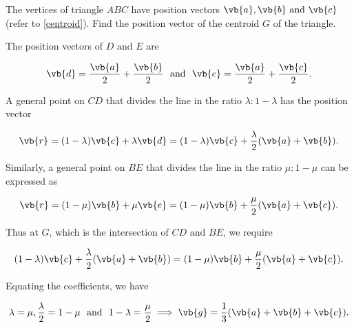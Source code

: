 \documentclass[a4paper,12pt]{report}
\begin{document}
{The vertices of triangle \(ABC\) have position vectors \(\vb{a} ,\vb{b} \text { and } \vb{c} \) (refer to \cref{centroid}). Find the position vector of the centroid \(G\) of the triangle.}
{The position vectors of \(D \text { and } E\) are 

\begin{equation}
    \vb{d} = \frac{\vb{a} }{2} + \frac{\vb{b} }{2} ~\text { and }~ \vb{e} = \frac{\vb{a} }{2} + \frac{\vb{c} }{2}.    
\end{equation}

A general point on \(CD\) that divides the line in the ratio \(\lambda : 1- \lambda \) has the position vector 

\begin{equation}
    \vb{r} = (1-\lambda )\vb{c} + \lambda \vb{d} = (1-\lambda )\vb{c} + \frac{\lambda }{2} (\vb{a} +\vb{b} ). 
\end{equation}

Similarly, a general point on \(BE\) that divides the line in the ratio \(\mu :1-\mu \) can be expressed as 

\begin{equation}
    \vb{r} = (1-\mu )\vb{b} + \mu \vb{e} = (1-\mu )\vb{b} + \frac{\mu }{2}(\vb{a} + \vb{c} ). 
\end{equation}

Thus at \(G\), which is the intersection of \(CD \text { and } BE\), we require

\begin{equation}
    (1-\lambda )\vb{c} + \frac{\lambda }{2}(\vb{a} +\vb{b} ) = (1-\mu )\vb{b} + \frac{\mu }{2}(\vb{a} +\vb{c} ).
\end{equation}

Equating the coefficients, we have

\begin{equation}
    \lambda = \mu , \frac{\lambda }{2} = 1-\mu ~\text { and }~ 1-\lambda = \frac{\mu }{2} \implies \vb{g} = \frac{1}{3}(\vb{a} +\vb{b} +\vb{c} ). 
\end{equation}







} 

\end{document}
